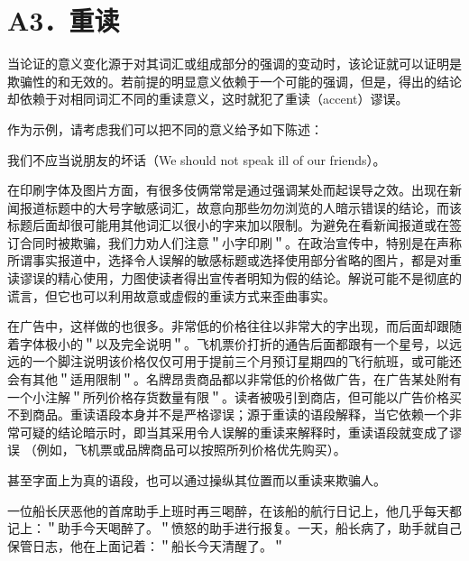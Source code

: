 \section*{A3．重读}
当论证的意义变化源于对其词汇或组成部分的强调的变动时，该论证就可以证明是欺骗性的和无效的。若前提的明显意义依赖于一个可能的强调，但是，得出的结论却依赖于对相同词汇不同的重读意义，这时就犯了重读（accent）谬误。

作为示例，请考虑我们可以把不同的意义给予如下陈述：

我们不应当说朋友的坏话（We should not speak ill of our friends）。

在印刷字体及图片方面，有很多伎俩常常是通过强调某处而起误导之效。出现在新闻报道标题中的大号字敏感词汇，故意向那些勿勿浏览的人暗示错误的结论，而该标题后面却很可能用其他词汇以很小的字来加以限制。为避免在看新闻报道或在签订合同时被欺骗，我们力劝人们注意＂小字印刷＂。在政治宣传中，特别是在声称所谓事实报道中，选择令人误解的敏感标题或选择使用部分省略的图片，都是对重读谬误的精心使用，力图使读者得出宣传者明知为假的结论。解说可能不是彻底的谎言，但它也可以利用故意或虚假的重读方式来歪曲事实。

在广告中，这样做的也很多。非常低的价格往往以非常大的字出现，而后面却跟随着字体极小的＂以及完全说明＂。飞机票价打折的通告后面都跟有一个星号，以远远的一个脚注说明该价格仅仅可用于提前三个月预订星期四的飞行航班，或可能还会有其他＂适用限制＂。名牌昂贵商品都以非常低的价格做广告，在广告某处附有一个小注解＂所列价格存货数量有限＂。读者被吸引到商店，但可能以广告价格买不到商品。重读语段本身并不是严格谬误；源于重读的语段解释，当它依赖一个非常可疑的结论暗示时，即当其采用令人误解的重读来解释时，重读语段就变成了谬误 （例如，飞机票或品牌商品可以按照所列价格优先购买）。

甚至字面上为真的语段，也可以通过操纵其位置而以重读来欺骗人。

一位船长厌恶他的首席助手上班时再三喝醉，在该船的航行日记上，他几乎每天都记上：＂助手今天喝醉了。＂愤怒的助手进行报复。一天，船长病了，助手就自己保管日志，他在上面记着：＂船长今天清醒了。＂ 